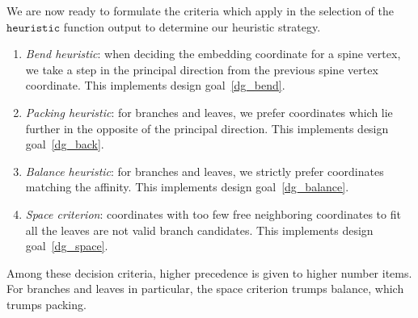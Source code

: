 We are now ready to formulate the criteria which apply in the selection of the $\texttt{heuristic}$ function output to determine our heuristic strategy.

\begin{enumerate}
    \item \emph{Bend heuristic}: when deciding the embedding coordinate for a spine vertex, we take a step in the principal direction from the previous spine vertex coordinate. This implements design goal~\ref{dg_bend}.
    \item \emph{Packing heuristic}: for branches and leaves, we prefer coordinates which lie further in the opposite of the principal direction. This implements design goal~\ref{dg_back}.
    \item \emph{Balance heuristic}: for branches and leaves, we strictly prefer coordinates matching the affinity. This implements design goal~\ref{dg_balance}.
    \item \emph{Space criterion}: coordinates with too few free neighboring coordinates to fit all the leaves are not valid branch candidates. This implements design goal~\ref{dg_space}.
\end{enumerate}

Among these decision criteria, higher precedence is given to higher number items. For branches and leaves in particular, the space criterion trumps balance, which trumps packing.

